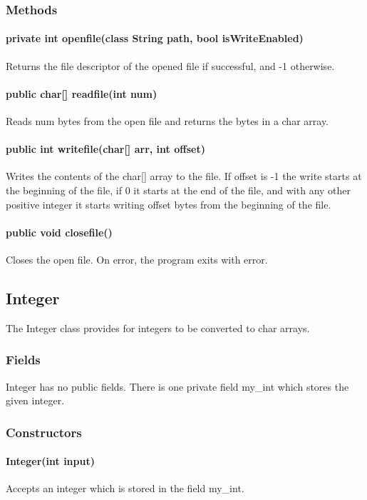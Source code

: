 \begin{homeworkProblem}
	\subsubsection{Methods}
	\paragraph{private int openfile(class String path, bool isWriteEnabled)}
	Returns the file descriptor of the opened file if successful, and -1 otherwise. 
	\paragraph{public char[] readfile(int num)}
	Reads num bytes from the open file and returns the bytes in a char array.
	\paragraph{public int writefile(char[] arr, int offset)}
	Writes the contents of the char[] array to the file. If offset is -1 the write starts at the beginning of the file, if 0 it starts at the end of the file, and with any other positive integer it starts writing offset bytes from the beginning of the file.
	\paragraph{public void closefile()}
	Closes the open file. On error, the program exits with error.
	
	\subsection{Integer}
	The Integer class provides for integers to be converted to char arrays.
	\subsubsection{Fields}
	Integer has no public fields. There is one private field my\_int which stores the given integer.
	
	\subsubsection{Constructors}
	\paragraph{Integer(int input)}
	Accepts an integer which is stored in the field my\_int.
	

\end{homeworkProblem}
